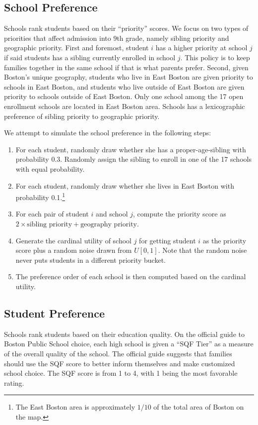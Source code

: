 \documentclass[10pt, reqno]{amsart}
\begin{document}
\subsection{School Preference}
Schools rank students based on their ``priority'' scores. We focus on two types of priorities that affect admission into 9th grade, namely sibling priority and geographic priority. First and foremost, student $i$ has a higher priority at school $j$ if said students has a sibling currently enrolled in school $j$. This policy is to keep families together in the same school if that is what parents prefer. Second, given Boston's unique geography, students who live in East Boston are given priority to schools in East Boston, and students who live outside of East Boston are given priority to schools outside of East Boston. Only one school among the 17 open enrollment schools are located in East Boston area. Schools has a lexicographic preference of sibling priority to geographic priority. 

We attempt to simulate the school preference in the following steps:
\begin{enumerate}
  \item For each student, randomly draw whether she has a proper-age-sibling with probability 0.3. Randomly assign the sibling to enroll in one of the 17 schools with equal probability. 
  \item For each student, randomly draw whether she lives in East Boston with probability 0.1.\footnote{The East Boston area is approximately $1/10$ of the total area of Boston on the map.}
  \item For each pair of student $i$ and school $j$, compute the priority score as $2\times \text{sibling priority} + \text{geography priority}$. 
  \item Generate the cardinal utility of school $j$ for getting student $i$ as the priority score plus a random noise drawn from $U[0,1]$. Note that the random noise never puts students in a different priority bucket. 
  \item The preference order of each school is then computed based on the cardinal utility. 
\end{enumerate}

\subsection{Student Preference}
Schools rank students based on their education quality. On the official guide to Boston Public School choice, each high school is given a ``SQF Tier'' as a measure of the overall quality of the school. The official guide suggests that families should use the SQF score to better inform themselves and make customized school choice. The SQF score is from 1 to 4, with 1 being the most favorable rating. 
\end{document}
